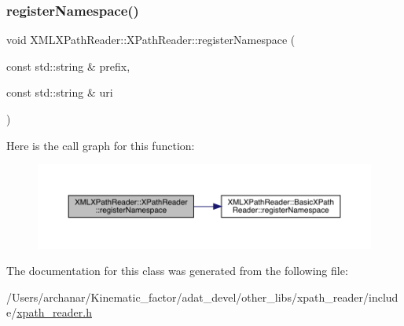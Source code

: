 \subsubsection{\texorpdfstring{registerNamespace()}{registerNamespace()}\hspace{0.1cm}{\footnotesize\ttfamily [2/2]}}
{\footnotesize\ttfamily void X\+M\+L\+X\+Path\+Reader\+::\+X\+Path\+Reader\+::register\+Namespace (\begin{DoxyParamCaption}\item[{const std\+::string \&}]{prefix,  }\item[{const std\+::string \&}]{uri }\end{DoxyParamCaption})\hspace{0.3cm}{\ttfamily [inline]}}

Here is the call graph for this function\+:
\nopagebreak
\begin{figure}[H]
\begin{center}
\leavevmode
\includegraphics[width=350pt]{d3/d5a/classXMLXPathReader_1_1XPathReader_a4df21ae718977be11eb5669002522ebb_cgraph}
\end{center}
\end{figure}


The documentation for this class was generated from the following file\+:\begin{DoxyCompactItemize}
\item 
/\+Users/archanar/\+Kinematic\+\_\+factor/adat\+\_\+devel/other\+\_\+libs/xpath\+\_\+reader/include/\mbox{\hyperlink{other__libs_2xpath__reader_2include_2xpath__reader_8h}{xpath\+\_\+reader.\+h}}\end{DoxyCompactItemize}
